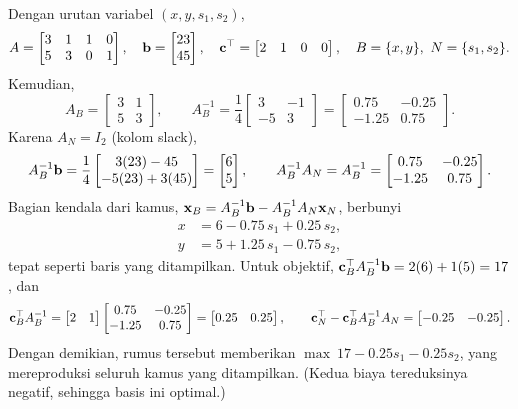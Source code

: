Dengan urutan variabel $(x, y, s_1, s_2)$,
\[
A = \begin{bmatrix} 3 & 1 & 1 & 0 \\ 5 & 3 & 0 & 1 \end{bmatrix},
\quad
\mathbf{b} = \begin{bmatrix} 23 \\ 45 \end{bmatrix},
\quad
\mathbf{c}^\top = \begin{bmatrix} 2 & 1 & 0 & 0 \end{bmatrix},
\quad
B = \{x, y\},\ N = \{s_1, s_2\}.
\]
Kemudian,
\[
A_B = \begin{bmatrix} 3 & 1 \\ 5 & 3 \end{bmatrix},
\qquad
A_B^{-1} = \frac{1}{4} \begin{bmatrix} 3 & -1 \\ -5 & 3 \end{bmatrix}
= \begin{bmatrix} 0.75 & -0.25 \\ -1.25 & 0.75 \end{bmatrix}.
\]
Karena $A_N = I_2$ (kolom slack),
\[
A_B^{-1}\mathbf{b} = \frac14 \begin{bmatrix} 3(23) - 45 \\ -5(23) + 3(45) \end{bmatrix}
= \begin{bmatrix} 6 \\ 5 \end{bmatrix},
\qquad
A_B^{-1}A_N = A_B^{-1}
= \begin{bmatrix} 0.75 & -0.25 \\ -1.25 & 0.75 \end{bmatrix}.
\]
Bagian kendala dari kamus,
$\mathbf{x}_B = A_B^{-1}\mathbf{b} - A_B^{-1}A_N \mathbf{x}_N$, berbunyi
\[
\begin{aligned}
x &= 6 - 0.75\,s_1 + 0.25\,s_2, \\
y &= 5 + 1.25\,s_1 - 0.75\,s_2,
\end{aligned}
\]
tepat seperti baris yang ditampilkan. Untuk objektif,
$\mathbf{c}_B^\top A_B^{-1}\mathbf{b} = 2(6) + 1(5) = 17$, dan
\[
\mathbf{c}_B^\top A_B^{-1} = \begin{bmatrix} 2 & 1 \end{bmatrix}
\begin{bmatrix} 0.75 & -0.25 \\ -1.25 & 0.75 \end{bmatrix}
= \begin{bmatrix} 0.25 & 0.25 \end{bmatrix},
\qquad
\mathbf{c}_N^\top - \mathbf{c}_B^\top A_B^{-1}A_N
= \begin{bmatrix} -0.25 & -0.25 \end{bmatrix}.
\]
Dengan demikian, rumus tersebut memberikan
$\max\ 17 - 0.25 s_1 - 0.25 s_2$, yang mereproduksi seluruh kamus yang
ditampilkan. (Kedua biaya tereduksinya negatif, sehingga basis ini optimal.)

